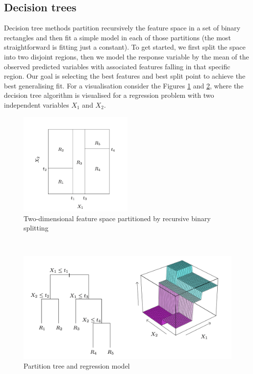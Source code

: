 \subsection{Decision trees}
Decision tree methods partition recursively the feature space in a set of binary rectangles and then fit a simple model in each of those partitions (the most straightforward is fitting just a constant).
To get started, we first split the space into two disjoint regions, then we model the response variable by the mean of the observed predicted variables with associated features falling in that specific region. Our goal is selecting the best features and best split point to achieve the best generalising fit.
For a visualisation consider the Figures \ref{fig:elements_statistical_learning1} and \ref{fig:elements_statistical_learning2}, where the decision tree algorithm is visualised for a regression problem with two independent variables $X_1$ and $X_2$.
\begin{figure}
    \includegraphics[width=0.5\textwidth]{images/elsii1.png}
    \caption{Two-dimensional feature space partitioned by recursive binary splitting \cite{hastie2009elements}}
    \label{fig:elements_statistical_learning1}
  \end{figure}
\\
\begin{figure}
\includegraphics[width=1\textwidth]{images/elsii2.png}
\caption{Partition tree and regression model \cite{hastie2009elements}}
\label{fig:elements_statistical_learning2}
\end{figure}

